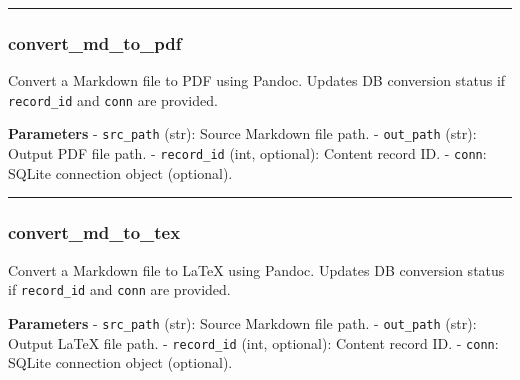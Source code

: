 \begin{center}\rule{0.5\linewidth}{0.5pt}\end{center}

\subsubsection{convert\_md\_to\_pdf}\label{convert_md_to_pdf}

\begin{Shaded}
\begin{Highlighting}[]
\OperatorTok{=}\OperatorTok{=}\NormalTok{)}
\end{Highlighting}
\end{Shaded}

Convert a Markdown file to PDF using Pandoc. Updates DB conversion
status if \texttt{record\_id} and \texttt{conn} are provided.

\textbf{Parameters} - \texttt{src\_path} (str): Source Markdown file
path. - \texttt{out\_path} (str): Output PDF file path. -
\texttt{record\_id} (int, optional): Content record ID. - \texttt{conn}:
SQLite connection object (optional).

\begin{center}\rule{0.5\linewidth}{0.5pt}\end{center}

\subsubsection{convert\_md\_to\_tex}\label{convert_md_to_tex}

\begin{Shaded}
\begin{Highlighting}[]
\OperatorTok{=}\OperatorTok{=}\NormalTok{)}
\end{Highlighting}
\end{Shaded}

Convert a Markdown file to LaTeX using Pandoc. Updates DB conversion
status if \texttt{record\_id} and \texttt{conn} are provided.

\textbf{Parameters} - \texttt{src\_path} (str): Source Markdown file
path. - \texttt{out\_path} (str): Output LaTeX file path. -
\texttt{record\_id} (int, optional): Content record ID. - \texttt{conn}:
SQLite connection object (optional).

